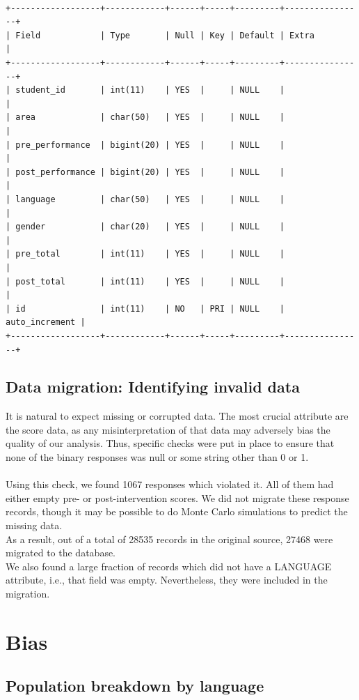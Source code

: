 \documentclass[10pt]{article}
\begin{document}
{\tt
\begin{verbatim}
+------------------+------------+------+-----+---------+----------------+
| Field            | Type       | Null | Key | Default | Extra          |
+------------------+------------+------+-----+---------+----------------+
| student_id       | int(11)    | YES  |     | NULL    |                |
| area             | char(50)   | YES  |     | NULL    |                |
| pre_performance  | bigint(20) | YES  |     | NULL    |                |
| post_performance | bigint(20) | YES  |     | NULL    |                |
| language         | char(50)   | YES  |     | NULL    |                |
| gender           | char(20)   | YES  |     | NULL    |                |
| pre_total        | int(11)    | YES  |     | NULL    |                |
| post_total       | int(11)    | YES  |     | NULL    |                |
| id               | int(11)    | NO   | PRI | NULL    | auto_increment |
+------------------+------------+------+-----+---------+----------------+
\end{verbatim}
}

\subsection{Data migration: Identifying invalid data}
It is natural to expect missing or corrupted data. The most crucial attribute are the score data, as any misinterpretation of that data may adversely bias the quality of our analysis. Thus, specific checks were put in place to ensure that none of the binary responses was null or some string other than 0 or 1.\\\\
Using this check, we found 1067 responses which violated it. All of them had either empty pre- or post-intervention scores. We did not migrate these response records, though it may be possible to do Monte Carlo simulations to predict the missing data.\\
As a result, out of a total of 28535 records in the original source, 27468 were migrated to the database.\\
We also found a large fraction of records which did not have a LANGUAGE attribute, i.e., that field was empty. Nevertheless, they were included in the migration.

\newpage
\section{Bias}
\subsection{Population breakdown by language}
\end{document}
